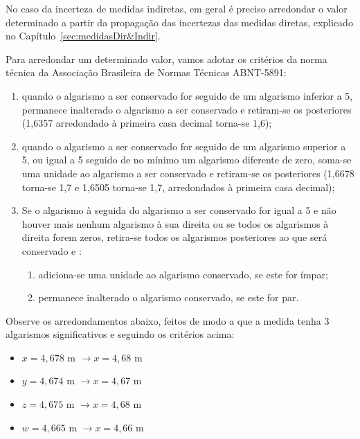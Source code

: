 No caso da incerteza de medidas indiretas, em geral \'e preciso arredondar o valor determinado a partir da propaga\c c\~ao das incertezas das medidas diretas, explicado no Capítulo~\ref{sec:medidasDir&Indir}.

Para arredondar um determinado valor,  vamos adotar os critérios da norma técnica da Associa\c c\~ao Brasileira de Normas T\'ecnicas ABNT-5891:
%
\begin{enumerate}
%
\item quando o algarismo a ser conservado for seguido de um algarismo inferior a 5, permanece inalterado o algarismo a ser conservado e retiram-se os posteriores (1,6357 arredondado à primeira casa decimal torna-se 1,6);
%
\item quando o algarismo a ser conservado for seguido de um algarismo superior a 5, ou igual a 5 seguido de no mínimo um algarismo diferente de zero, soma-se uma unidade ao algarismo a ser conservado e retiram-se os posteriores (1,6678 torna-se 1,7 e 1,6505 torna-se 1,7, arredondados à primeira casa decimal);
%
\item Se o algarismo à seguida do algarismo a ser conservado for igual a 5 e não houver mais nenhum algarismo à sua direita ou se todos os algarismos à direita forem zeros, retira-se todos os algarismos posteriores ao que será conservado e :
\begin{enumerate}
\item adiciona-se uma unidade ao algarismo conservado, se este for ímpar;
\item permanece inalterado o algarismo conservado, se este for par.
\end{enumerate}
%
\end{enumerate}
%
Observe os arredondamentos abaixo, feitos de modo a que a medida tenha 3 algarismos significativos e seguindo os critérios acima:
\begin{itemize}
%
\item $x = 4,678$ m $\rightarrow x = 4,\!68$ m 
\item $y = 4,674$ m $\rightarrow x = 4,\!67$ m 
\item $z = 4,675$ m $\rightarrow x = 4,\!68$ m  
\item $w = 4,665$ m $\rightarrow x = 4,\!66$ m 
%
\end{itemize}

